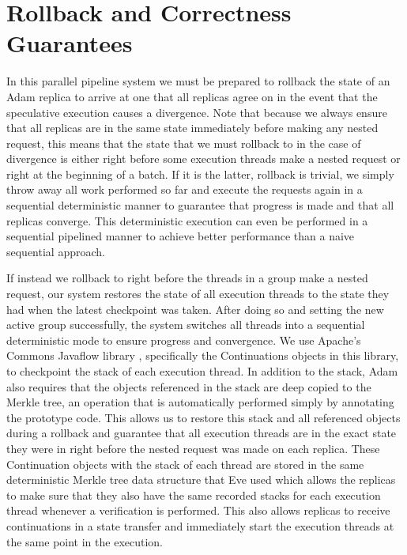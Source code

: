 \documentclass[11pt, oneside]{report}
\begin{document}
\section{Rollback and Correctness Guarantees}

In this parallel pipeline system we must be prepared to rollback the state of an Adam replica to arrive at one that all replicas agree on in the event that the speculative execution causes a divergence. 
Note that because we always ensure that all replicas are in the same state immediately before making any nested request, this means that the state that we must rollback to in the case of divergence is either right before some execution threads make a nested request or right at the beginning of a batch. 
If it is the latter, rollback is trivial, we simply throw away all work performed so far and execute the requests again in a sequential deterministic manner to guarantee that progress is made and that all replicas converge. 
This deterministic execution can even be performed in a sequential pipelined manner to achieve better performance than a naive sequential approach.

If instead we rollback to right before the threads in a group make a nested request, our system restores the state of all execution threads to the state they had when the latest checkpoint was taken. After doing so and setting the new active group successfully, the system switches all threads into a sequential deterministic mode to ensure progress and convergence.
We use Apache's Commons Javaflow library \cite{javaflow}, specifically the Continuations objects in this library, to checkpoint the stack of each execution thread.
In addition to the stack, Adam also requires that the objects referenced in the stack are deep copied to the Merkle tree, an operation that is automatically performed simply by annotating the prototype code.
This allows us to restore this stack and all referenced objects during a rollback and guarantee that all execution threads are in the exact state they were in right before the nested request was made on each replica.
These Continuation objects with the stack of each thread are stored in the same deterministic Merkle tree data structure that Eve used which allows the replicas to make sure that they also have the same recorded stacks for each execution thread whenever a verification is performed.
This also allows replicas to receive continuations in a state transfer and immediately start the execution threads at the same point in the execution. 
\end{document}

